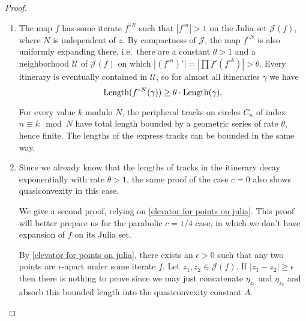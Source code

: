 \begin{proof}
	\begin{enumerate}[label=(\roman*)]
\item The map $f$ has some iterate $f^{\circ N}$ such that $|f^{\circ n}|>1$ on the Julia set $\mathcal{J}(f)$, where $N$ is independent of $z$.
By compactness of $\mathcal J$, the map $f^{\circ N}$ is also uniformly expanding there, i.e.\ there are a constant $\theta>1$ and a neighborhood $\mathcal{U}$ of $\mathcal{J}(f)$ on which $\left|(f^{\circ n})'\right|=|\prod f'(f^{\circ k}) |>\theta$. 
Every itinerary is eventually contained in $\mathcal{U}$, so for almost all itineraries $\gamma$ we have 
\begin{equation*}
\operatorname{Length} ( f^{\circ N}(\gamma) ) \geq \theta \cdot \operatorname{Length}( \gamma). 
\end{equation*}

For every value $k$ modulo $N$, the peripheral tracks on circles $C_n$ of index $n \equiv k \mod N$ have total length bounded by a geometric series of rate $\theta$, hence finite. 
The lengths of the express tracks can be bounded in the same way. %

\item Since we already know that the lengths of tracks in the itinerary decay exponentially with rate $\theta>1$, the same proof of the case $c=0$ also shows quasiconvexity in this case.

We give a second proof, relying on \cref{elevator for points on julia}. This proof will better prepare us for the
parabolic $c=1/4$ case, in which we don't have expansion of $f$ on its Julia set.

By \cref{elevator for points on julia}, there exists an $\epsilon>0$ such that any two points are $\epsilon$-apart under some iterate $f$. 
Let $z_{1},z_{2}\in\mathcal{J}(f)$. If $\left|z_{1}-z_{2}\right|\geq\epsilon$ then there is nothing to
prove since we may just concatenate $\eta_{z_{1}}$ and $\eta_{z_{2}}$
and absorb this bounded length into the quasiconvexity constant
$A$. 
\begin{comment}
Explicitly, if $\Length\left(\eta_{z}\right)\leq L$
for all $z\in\mathcal{J}$ then we take $A\geq\frac{2L}{\epsilon}$
and then automatically $\Length\left(\eta_{z_{1}}+\eta_{z_{2}}\right)\leq A\left|z_{1}-z_{2}\right|$.
\end{comment}


\end{enumerate}
\end{proof}
